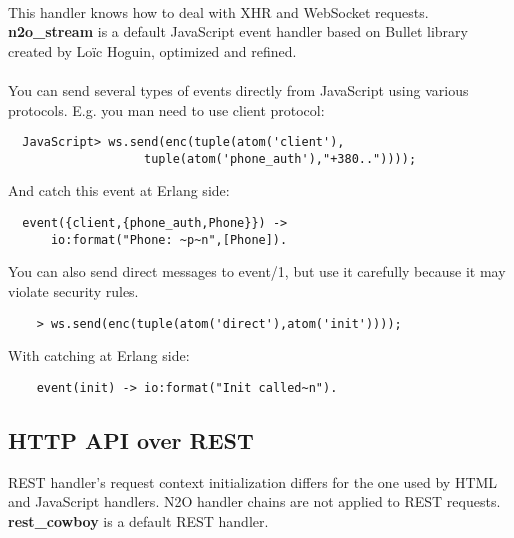 \paragraph{}
This handler knows how to deal with XHR and WebSocket requests.
{\bf {n2o}\_{stream}} is a default JavaScript event handler
based on Bullet library created by Loïc Hoguin, optimized and refined.

\paragraph{}
You can send several types of events directly from JavaScript
using various protocols. E.g. you man need to use client protocol:

\vspace{1\baselineskip}
\begin{lstlisting}
  JavaScript> ws.send(enc(tuple(atom('client'),
                   tuple(atom('phone_auth'),"+380.."))));
\end{lstlisting}
\vspace{1\baselineskip}

And catch this event at Erlang side:

\vspace{1\baselineskip}
\begin{lstlisting}
  event({client,{phone_auth,Phone}}) ->
      io:format("Phone: ~p~n",[Phone]).
\end{lstlisting}
\vspace{1\baselineskip}

You can also send direct messages to event/1, but use it carefully
because it may violate security rules.

\vspace{1\baselineskip}
\begin{lstlisting}
    > ws.send(enc(tuple(atom('direct'),atom('init'))));
\end{lstlisting}
\vspace{1\baselineskip}

With catching at Erlang side:

\vspace{1\baselineskip}
\begin{lstlisting}
    event(init) -> io:format("Init called~n").
\end{lstlisting}
\vspace{1\baselineskip}

\newpage
\subsection{HTTP API over REST}
REST handler's request context initialization differs for the one
used by HTML and JavaScript handlers. N2O handler chains are not
applied to REST requests. {\bf rest\_cowboy} is a default REST
handler.


